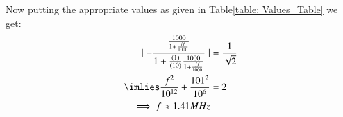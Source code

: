 \begin{enumerate}[label=\thesection.\arabic*.,ref=\thesection.\theenumi]
\begin{table}[!ht]
\centering

\caption{}
\label{table: Values_Table}
\end{table}
Now putting the appropriate values as given in Table\ref{table: Values_Table} we get:
\begin{align}
     \mid-\frac{\frac{1000}{1 + \frac{jf}{1000}}}{1 + \frac{(1)}{(10)}\frac{1000}{1 + \frac{jf}{1000}}}\mid &= \frac{1}{\sqrt{2}}
     \\
     \imlies \frac{f^2}{10^{1 2}} + \frac{101^2}{10^6} &= 2
     \\
     \implies f \approx 1.41MHz
\end{align}

\end{enumerate}

